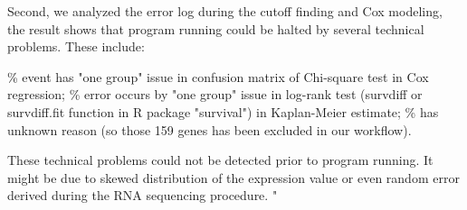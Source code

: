 \documentclass[preprint,12pt]{elsarticle}
\newenvironment{MyIndent}
{\par\leftskip1cm\relax\rightskip1cm\relax}
{\par\leftskip0cm\relax\rightskip0cm\relax}
\newenvironment{MyColorPar}[1]{%
    \leavevmode\color{#1}\ignorespaces%
}{%
}%
\begin{document}
\begin{MyColorPar}{blue}
\begin{MyIndent}
\begin{MyColorPar}{red}
Second, we analyzed the error log during the cutoff finding and Cox modeling, 
the result shows that program running could be halted by several technical problems.
These include:
\begin{outline}

\% event has "one group" issue in confusion matrix of Chi-square test in Cox regression;
\% error occurs by "one group" issue in log-rank test (survdiff or survdiff.fit function in R package "survival") in Kaplan-Meier estimate;
\% has unknown reason (so those 159 genes has been excluded in our workflow).
\end{outline}
These technical problems could not be detected prior to program running.
It might be due to skewed distribution of the expression value or even random error derived during the RNA sequencing procedure. %
"




\end{MyColorPar} %
\end{MyIndent}

\end{MyColorPar} %
\end{document}
